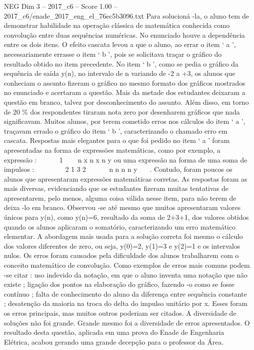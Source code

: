\begin{textsample}{NEG Dim 3 – 2017\_c6 – Score 1.00 – 2017\_c6/enade\_2017\_eng\_el\_76ec5b3096.txt}
Para solucioná -la, o aluno tem de demonstrar habilidade na operação clássica de matemática conhecida como convolução entre duas sequências numéricas.
No enunciado houve a dependência entre os dois itens.
O efeito cascata levou a que o aluno, ao errar o item ‘ a ’, necessariamente errasse o item ‘ b ’, pois se solicitava traçar o gráfico do resultado obtido no item precedente.
No item ‘ b ’, como se pedia o gráfico da sequência de saída y(n), no intervalo de n variando de -2 a +3, os alunos que conheciam o assunto fizeram o gráfico no mesmo formato dos gráficos mostrados no enunciado e acertaram a questão.
Mais da metade dos estudantes deixaram a questão em branco, talvez por desconhecimento do assunto.
Além disso, em torno de 20 \% dos respondentes tiraram nota zero por desenharem gráficos que nada significavam.
Muitos alunos, por terem cometido erros nos cálculos do item ‘ a ’, traçavam errado o gráfico do item ‘ b ’, caracterizando o chamado erro em cascata.
Respostas mais elegantes para o que foi pedido no item ‘ a ’ foram apresentadas na forma de expressões matemáticas, como por exemplo, a expressão :     1    n x n x n y ou uma expressão na forma de uma soma de impulsos :       2 1 3 2      n n n n y   .
Contudo, foram poucos os alunos que apresentaram expressões matemáticas corretas.
As respostas foram as mais diversas, evidenciando que os estudantes fizeram muitas tentativas de apresentarem, pelo menos, alguma coisa válida nesse item, para não terem de deixa -lo em branco.
Observou -se até mesmo que muitos apresentaram valores únicos para y(n), como y(n)=6, resultado da soma de 2+3+1, dos valores obtidos quando os alunos aplicaram o somatório, caracterizando um erro matemático elementar.
A abordagem mais usada para a solução correta foi mesmo o cálculo dos valores diferentes de zero, ou seja, y(0)=2, y(1)=3 e y(2)=1 e os intervalos nulos.
Os erros foram causados pela dificuldade dos alunos trabalharem com o conceito matemático de convolução.
Como exemplos de erros mais comuns podem -se citar : uso indevido da notação, em que o aluno inventa uma notação que não existe ; ligação dos pontos na elaboração do gráfico, fazendo -o como se fosse contínuo ; falta de conhecimento do aluno da diferença entre sequência constante ; desatenção da maioria na troca do delta do impulso unitário por x.
Esses foram os erros principais, mas muitos outros poderiam ser citados.
A diversidade de soluções não foi grande.
Grande mesmo foi a diversidade de erros apresentados.
O resultado desta questão, aplicada em uma prova do Enade de Engenharia Elétrica, acabou gerando uma grande decepção para o professor da Área.

\end{textsample}
